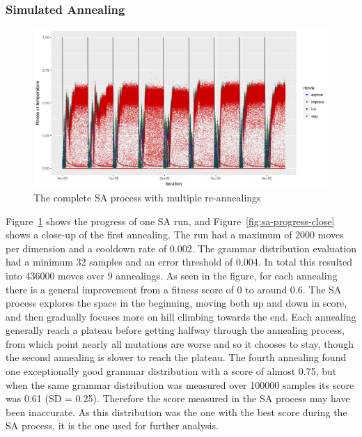 \subsubsection{Simulated Annealing}
\begin{figure}
    \includegraphics[width=\textwidth]{figures/sa-progress}
    \caption[The complete SA process with multiple re-annealings]{The complete \gls{SA} process with multiple re-annealings}
    \label{fig:sa-progress}
\end{figure}

Figure~\ref{fig:sa-progress} shows the progress of one \gls{SA} run, and Figure~\ref{fig:sa-progress-close} shows a close-up of the first annealing.
The run had a maximum of 2000 moves per dimension and a cooldown rate of 0.002.
The grammar distribution evaluation had a minimum 32 samples and an error threshold of 0.004.
In total this resulted into 436000 moves over 9 annealings.
As seen in the figure, for each annealing there is a general improvement from a fitness score of 0 to around 0.6.
The \gls{SA} process explores the space in the beginning, moving both up and down in score, and then gradually focuses more on hill climbing towards the end.
Each annealing generally reach a plateau before getting halfway through the annealing process, from which point nearly all mutations are worse and so it chooses to stay, though the second annealing is slower to reach the plateau.
The fourth annealing found one exceptionally good grammar distribution with a score of almost 0.75, but when the same grammar distribution was measured over 100000 samples its score was 0.61 (SD = 0.25).
Therefore the score measured in the \gls{SA} process may have been inaccurate.
As this distribution was the one with the best score during the \gls{SA} process, it is the one used for further analysis.

